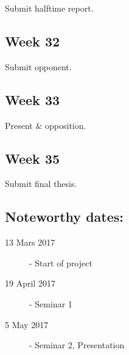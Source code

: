 Submit halftime report.

\subsection{Week 32}

Submit opponent.

\subsection{Week 33}

Present $\&$ opposition.

\subsection{Week 35}

Submit final thesis.

\subsection{Noteworthy dates:}

\begin{description}
  \item [13 Mars 2017] - Start of project
  \item [19 April 2017] - Seminar 1
  \item [5 May 2017] - Seminar 2, Presentation
\end{description}


